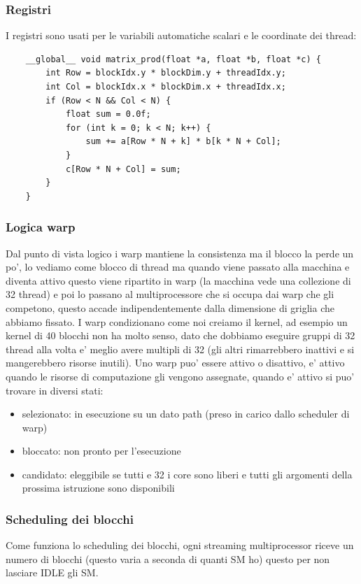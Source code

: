 \subsubsection{Registri}
I registri sono usati per le variabili automatiche scalari e le coordinate dei thread:

\begin{lstlisting}
    __global__ void matrix_prod(float *a, float *b, float *c) {
        int Row = blockIdx.y * blockDim.y + threadIdx.y;
        int Col = blockIdx.x * blockDim.x + threadIdx.x;
        if (Row < N && Col < N) {
            float sum = 0.0f;
            for (int k = 0; k < N; k++) {
                sum += a[Row * N + k] * b[k * N + Col];
            }
            c[Row * N + Col] = sum;
        }
    }
\end{lstlisting}

\subsubsection{Logica warp}
Dal punto di vista logico i warp mantiene la consistenza ma il blocco la perde un po', lo vediamo come blocco di thread ma quando viene passato alla macchina e diventa attivo questo viene ripartito in warp (la macchina vede una collezione di 32 thread) e poi lo passano al multiprocessore che si occupa dai warp che gli competono, questo accade indipendentemente dalla dimensione di griglia che abbiamo fissato.
I warp condizionano come noi creiamo il kernel, ad esempio un kernel di 40 blocchi non ha molto senso, dato che dobbiamo eseguire gruppi di 32 thread alla volta e' meglio avere multipli di 32 (gli altri rimarrebbero inattivi e si mangerebbero risorse inutili).
Uno warp puo' essere attivo o disattivo, e' attivo quando le risorse di computazione gli vengono assegnate, quando e' attivo si puo' trovare in diversi stati:
\begin{itemize}
    \item selezionato: in esecuzione su un dato path (preso in carico dallo scheduler di warp)
    \item bloccato: non pronto per l'esecuzione
    \item candidato: eleggibile se tutti e 32 i core sono liberi e tutti gli argomenti della prossima istruzione sono disponibili
\end{itemize}

\subsubsection{Scheduling dei blocchi}
Come funziona lo scheduling dei blocchi, ogni streaming multiprocessor riceve un numero di blocchi (questo varia a seconda di quanti SM ho) questo per non lasciare IDLE gli SM.

